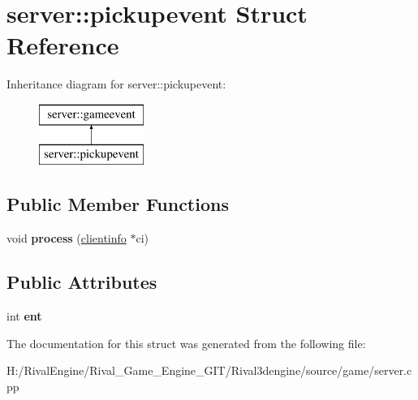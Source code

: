 \hypertarget{structserver_1_1pickupevent}{}\section{server\+:\+:pickupevent Struct Reference}
\label{structserver_1_1pickupevent}
Inheritance diagram for server\+:\+:pickupevent\+:\begin{figure}[H]
\begin{center}
\leavevmode
\includegraphics[height=2.000000cm]{structserver_1_1pickupevent}
\end{center}
\end{figure}
\subsection*{Public Member Functions}
\begin{DoxyCompactItemize}
\item 
\mbox{\label{structserver_1_1pickupevent_ae2e78361455fc50e6caad25a9a46dae9}} 
void {\bfseries process} (\hyperlink{structserver_1_1clientinfo}{clientinfo} $\ast$ci)
\end{DoxyCompactItemize}
\subsection*{Public Attributes}
\begin{DoxyCompactItemize}
\item 
\mbox{\label{structserver_1_1pickupevent_a79475e87b5441964741cd3ed13622519}} 
int {\bfseries ent}
\end{DoxyCompactItemize}


The documentation for this struct was generated from the following file\+:\begin{DoxyCompactItemize}
\item 
H\+:/\+Rival\+Engine/\+Rival\+\_\+\+Game\+\_\+\+Engine\+\_\+\+G\+I\+T/\+Rival3dengine/source/game/server.\+cpp\end{DoxyCompactItemize}
